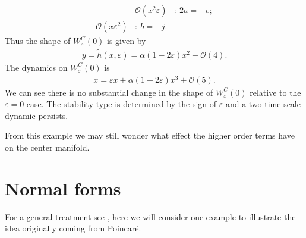 \begin{ex}
\begin{subequations}
\begin{align}
		&\mathcal{O}(x^2\varepsilon)&:\ 2a=-e;\\
		\mathcal{O}(x\varepsilon^2)&:\ b=-j.
	\end{align}\end{subequations}
	Thus the shape of $W^{C}_{\varepsilon}(0)$ is given by 
	\begin{align}
		y = \tilde{h}(x,\varepsilon) = \alpha(1-2\varepsilon)x^2+ \mathcal{O}(4).
	\end{align}
	The dynamics on $W^{C}_{\varepsilon}(0)$ is
	\begin{align}
		\dot{x} = \varepsilon x + \alpha(1-2\varepsilon)x^3 + \mathcal{O}(5).
	\end{align}
	We can see there is no substantial change in the shape of $W^{C}_{\varepsilon}(0)$ relative to the $\varepsilon=0$ case. The stability type is determined by the sign of $\varepsilon$ and a two time-scale dynamic persists.	
\end{ex}
From this example we may still wonder what effect the higher order terms have on the center manifold.

\section{Normal forms}
For a general treatment see \cite{GuckenheimerHolmes}, here we will consider one example to illustrate the idea originally coming from Poincaré.

